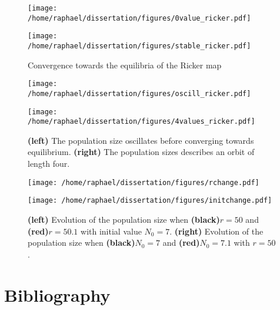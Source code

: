 \documentclass{article}
\begin{document}
	\begin{figure}[htb]
		\centering
		\begin{minipage}{0.4\textwidth}
			\centering
			\texttt{[image: /home/raphael/dissertation/figures/0value\_ricker.pdf]}
		\end{minipage}
		\begin{minipage}{0.4\textwidth}
			\centering
			\texttt{[image: /home/raphael/dissertation/figures/stable\_ricker.pdf]}
		\end{minipage}
		\caption{Convergence towards the equilibria of the Ricker map}
		\label{fig:stab}
	\end{figure}

	\begin{figure}[htb]
		\centering
		\begin{minipage}{0.4\textwidth}
			\centering
			\texttt{[image: /home/raphael/dissertation/figures/oscill\_ricker.pdf]}
		\end{minipage}
		\begin{minipage}{0.4\textwidth}
			\centering
			\texttt{[image: /home/raphael/dissertation/figures/4values\_ricker.pdf]}
		\end{minipage}
		\caption{\textbf{(left)} The population size oscillates before converging towards equilibrium. \textbf{(right)} The population sizes describes an orbit of length four.}
		\label{fig:oscill}
	\end{figure}
	
	\begin{figure}[htb]
		\centering
		\begin{minipage}{0.4\textwidth}
			\centering
			\texttt{[image: /home/raphael/dissertation/figures/rchange.pdf]}
		\end{minipage}
		\begin{minipage}{0.4\textwidth}
			\centering
			\texttt{[image: /home/raphael/dissertation/figures/initchange.pdf]}
		\end{minipage}
		\caption{\textbf{(left)} Evolution of the population size when \textbf{(black)}$r=50$ and \textbf{(red)}$r=50.1$ with initial value $N_0=7$. \textbf{(right)} Evolution of the population size when \textbf{(black)}$N_0=7$ and \textbf{(red)}$N_0=7.1$ with $r=50$.}
		\label{fig:chaos}
	\end{figure}

\clearpage
	\section{Bibliography}
	
	{}
\end{document}
